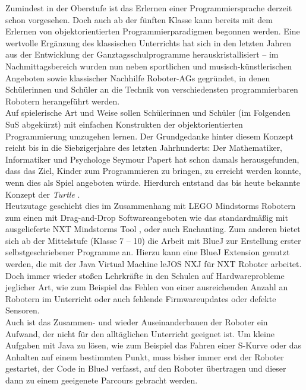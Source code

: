 \documentclass[paper=a4, pagesize, DIV=calc, BCOR=12.5mm, twoside=on, onecolumn=on, open = any, titlepage =on, parskip =half-, headsepline = on, footsepline = on, chapterprefix = on, appendixprefix = off, fontsize = 12pt, numbers = noenddot, abstract = on]{scrbook}
\numberwithin{equation}{chapter}
\theoremstyle{definition}
\theoremstyle{plain}
\theoremstyle{plain}
\theoremstyle{remark}
\theoremstyle{plain}
\theoremstyle{plain}
\begin{document}
Zumindest in der Oberstufe ist das Erlernen einer Programmiersprache derzeit schon vorgesehen. Doch auch ab der fünften Klasse kann bereits mit dem Erlernen von objektorientierten Programmierparadigmen begonnen werden. Eine wertvolle Ergänzung des klassischen Unterrichts hat sich in den letzten Jahren aus der Entwicklung der Ganztagsschulprogramme herauskristallisiert -- im Nachmittagsbereich wurden nun neben sportlichen und musisch-künstlerischen Angeboten sowie klassischer Nachhilfe Roboter-AGs gegründet, in denen Schülerinnen und Schüler an die Technik von verschiedensten programmierbaren Robotern herangeführt werden.\\
Auf spielerische Art und Weise sollen Schülerinnen und Schüler (im Folgenden SuS abgekürzt) mit einfachen Konstrukten der objektorientierten Programmierung umzugehen lernen. Der Grundgedanke hinter diesem Konzept reicht bis in die Siebzigerjahre des letzten Jahrhunderts: Der Mathematiker, Informatiker und Psychologe Seymour Papert hat schon damals herausgefunden, dass das Ziel, Kinder zum Programmieren zu bringen, zu erreicht werden konnte, wenn dies als Spiel angeboten würde. Hierdurch entstand das bis heute bekannte Konzept der \emph{Turtle} \cite[S.365]{nievergelt:99}.\\
Heutzutage geschieht dies im Zusammenhang mit LEGO Mindstorms Robotern zum einen mit Drag-and-Drop Softwareangeboten wie das standardmäßig mit ausgelieferte NXT Mindstorms Tool , oder auch Enchanting.  Zum anderen bietet sich ab der Mittelstufe (Klasse 7 -- 10) die Arbeit mit BlueJ zur Erstellung erster selbstgeschriebener Programme an. Hierzu kann eine BlueJ Extension genutzt werden, die mit der Java Virtual Machine leJOS NXJ für NXT Roboter arbeitet.\\

Doch immer wieder stoßen Lehrkräfte in den Schulen auf Hardwareprobleme jeglicher Art, wie zum Beispiel das Fehlen von einer ausreichenden Anzahl an Robotern im Unterricht oder auch fehlende Firmwareupdates oder defekte Sensoren.\\
Auch ist das Zusammen- und wieder Auseinanderbauen der Roboter ein Aufwand, der nicht für den alltäglichen Unterricht geeignet ist. Um kleine Aufgaben mit Java zu lösen, wie zum Beispiel das Fahren einer S-Kurve oder das Anhalten auf einem bestimmten Punkt, muss bisher immer erst der Roboter gestartet, der Code in BlueJ verfasst, auf den Roboter übertragen und dieser dann zu einem geeigenete Parcours gebracht werden.\\
\end{document}
